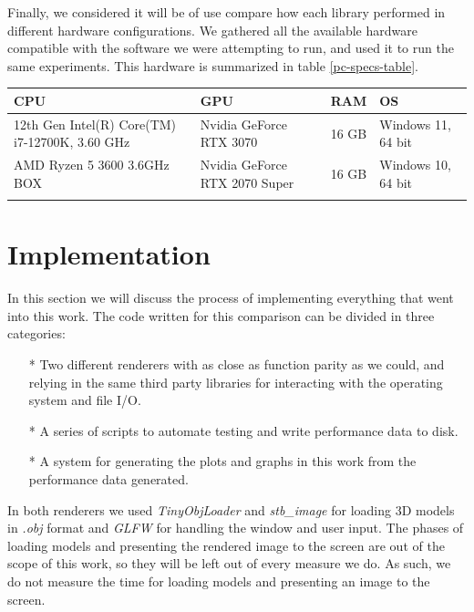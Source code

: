 Finally, we considered it will be of use compare how each library performed in different hardware configurations. We gathered all the available hardware compatible with the software we were attempting to run, and used it to run the same experiments. This hardware is summarized in table \ref{pc-specs-table}.

\begin{center}
  \begin{tabular}{ | m{5cm} | m{3.5cm}| m{2cm}|m{4cm} |}
  \hline
  CPU& GPU& RAM& OS\\
  \hline
    12th Gen Intel(R) Core(TM) i7-12700K, 3.60 GHz& Nvidia GeForce RTX 3070& 16 GB& Windows 11, 64 bit\\
  \hline
    AMD Ryzen 5 3600 3.6GHz BOX& Nvidia GeForce RTX 2070 Super& 16 GB& Windows 10, 64 bit\\
  \label{pc-specs-table}
\end{tabular}
\end{center}

\clearpage


\section{Implementation}
In this section we will discuss the process of implementing everything that went into this work. The code written for this comparison can be divided in three categories:

\begin{itemize}
    \item[*]{Two different renderers with as close as function parity as we could, and relying in the same third party libraries for interacting with the operating system and file I/O.}
    \item[*]{A series of scripts to automate testing and write performance data to disk.}
    \item[*]{A system for generating the plots and graphs in this work from the performance data generated.}
\end{itemize}

In both renderers we used \textit{TinyObjLoader} and \textit{stb\_image} for loading 3D models in \textit{.obj} format and \textit{GLFW} for handling the window and user input. The phases of loading models and presenting the rendered image to the screen are out of the scope of this work, so they will be left out of every measure we do. As such, we do not measure the time for loading models and presenting an image to the screen.

